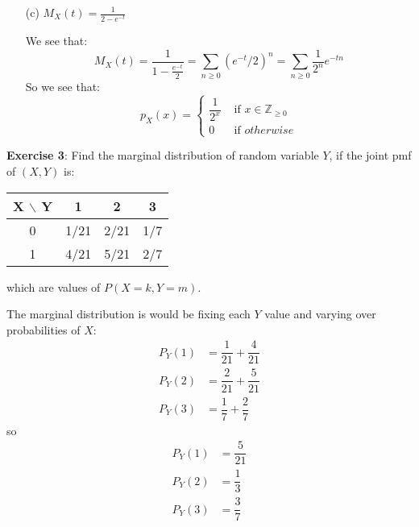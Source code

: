 \documentclass{article}
\begin{document}
\begin{itemize}
        \item [(c)] $M_{X}(t) = \frac{1}{2 - e^{-t}}$ 
            \begin{answer}
                We see that:
                    \begin{equation*}
                        M_{X}(t) = \dfrac{1}{1 - \frac{e^{-t}}{2}} = \sum_{n \geq 0} (e^{-t}/2)^{n} = \sum_{n \geq 0} \dfrac{1}{2^{n}}e^{-tn}
                    \end{equation*}
                So we see that:
                    \begin{equation*}
                        p_{X}(x) = \begin{cases}
                            \dfrac{1}{2^{x}} &\text{ if } x \in \mathbb{Z}_{\geq 0} \\
                            0 &\text{ if } otherwise          
                        \end{cases}
                    \end{equation*}
            \end{answer}
    \end{itemize}

\newpage

\textbf{Exercise 3}: Find the marginal distribution of random variable $Y$, if the joint pmf of $(X, Y)$ is:
    \begin{center}
        \begin{tabular}{ c c c c }
            \hline X $\backslash$ Y & 1    & 2    & 3   \\
            \hline 0    & 1/21 & 2/21 & 1/7 \\
            \hline 1    & 4/21 & 5/21 & 2/7   
        \end{tabular}
    \end{center}
which are values of $P(X = k, Y = m)$.
    \begin{answer}
        The marginal distribution is would be fixing each $Y$ value and varying over probabilities of $X$:
            \begin{align*}
                P_{Y}(1) &= \dfrac{1}{21} + \dfrac{4}{21} \\
                P_{Y}(2) &= \dfrac{2}{21} + \dfrac{5}{21} \\
                P_{Y}(3) &= \dfrac{1}{7} + \dfrac{2}{7}     
            \end{align*}
        so
            \begin{align*}
                P_{Y}(1) &= \dfrac{5}{21} \\
                P_{Y}(2) &= \dfrac{1}{3}  \\
                P_{Y}(3) &= \dfrac{3}{7}    
            \end{align*}
    \end{answer}
\end{document}
